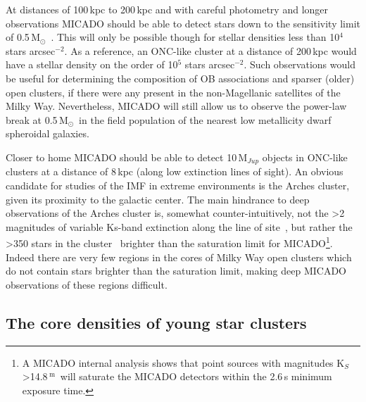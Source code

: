 \documentclass{aa}
\newcommand{\m}{$^\mathrm{m}$~}
\newcommand{\msun}{M$_\odot$~}
\newcommand{\h}[1]{$^{#1}$}
\newcommand{\spae}{stars arcsec$^{-2}$}
\begin{document}
At distances of 100\,kpc to 200\,kpc and with careful photometry and longer observations MICADO should be able to detect stars down to the sensitivity limit of 0.5\,\msun.
This will only be possible though for stellar densities less than 10\h4 \spae.
As a reference, an ONC-like cluster at a distance of 200\,kpc would have a stellar density on the order of 10\h5 \spae.
Such observations would be useful for determining the composition of OB associations and sparser (older) open clusters, if there were any present in the non-Magellanic satellites of the Milky Way.
Nevertheless, MICADO will still allow us to observe the power-law break at 0.5\,\msun in the field population of the nearest low metallicity dwarf spheroidal galaxies.

Closer to home MICADO should be able to detect 10\,M$_{Jup}$ objects in ONC-like clusters at a distance of 8\,kpc (along low extinction lines of sight).
An obvious candidate for studies of the IMF in extreme environments is the Arches cluster, given its proximity to the galactic center.
The main hindrance to deep observations of the Arches cluster is, somewhat counter-intuitively, not the \textgreater2 magnitudes of variable Ks-band extinction along the line of site~\citep{espinoza2009}, but rather the \textgreater350 stars in the cluster~\citep{galacticnucleaus} brighter than the saturation limit for MICADO\footnote{A MICADO internal analysis shows that point sources with magnitudes K$_S$\textgreater14.8\,\m will saturate the MICADO detectors within the 2.6\,s minimum exposure time.}.
Indeed there are very few regions in the cores of Milky Way open clusters which do not contain stars brighter than the saturation limit, making deep MICADO observations of these regions difficult.


\subsection{The core densities of young star clusters}
  \label{subsec:core_densities}
\end{document}
